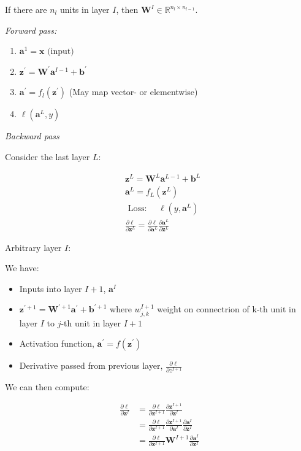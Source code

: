 \documentclass[11pt, %
	oneside, %
	english, %
	onehalfspacing, %
	parskip, %
	]{article} %
\theoremstyle{definition}
\begin{document}
If there are $n_l$ units in layer $I$, then $\mathbf{W}^{I} \in \mathbb{R}^{n_l \times n_{l-1}}$.

\noindent\emph{Forward pass:}

\begin{enumerate}
	\item $\mathbf{a}^1=\mathbf{x} \text { (input) }$
	\item $\mathbf{z}^{\prime}=\mathbf{W}^{\prime} \mathbf{a}^{I-1}+\mathbf{b}^{\prime}$
	\item $\mathbf{a}^{\prime}=f_l\left(\mathbf{z}^{\prime}\right)$  (May map vector- or elementwise)
	\item $\ell\left(\mathbf{a}^L, y\right)$
\end{enumerate}

\noindent\emph{Backward pass}

Consider the last layer $L$:

\begin{equation*}
	\begin{aligned}
		& \mathbf{z}^L=\mathbf{W}^L \mathbf{a}^{L-1}+\mathbf{b}^L \\
		& \mathbf{a}^L=f_L\left(\mathbf{z}^L\right) \\
		& \text { Loss: } \quad \ell\left(y, \mathbf{a}^L\right) \\
		& \frac{\partial \ell}{\partial \mathbf{z}^L}=\frac{\partial \ell}{\partial \mathbf{a}^L} \frac{\partial \mathbf{a}^L}{\partial \mathbf{z}^L}
		\end{aligned}
\end{equation*}

Arbitrary layer $I$:

We have:
\begin{itemize}
	\item Inputs into layer $I+1$, $\mathbf{a}^I$
	\item $\mathbf{z}^{\prime+1}=\mathbf{W}^{\prime+1} \mathbf{a}^{\prime}+\mathbf{b}^{\prime+1}$ where $w_{j,k}^{I+1}$ weight on connectrion of k-th unit in layer $I$ to $j$-th unit in layer $I+1$
	\item Activation function, $\mathbf{a}^{\prime}=f\left(\mathbf{z}^{\prime}\right)$
	\item Derivative passed from previous layer, $\frac{\partial \ell}{\partial z^{I+1}}$
\end{itemize}

We can then compute:

\begin{equation*}
	\begin{aligned}
		\frac{\partial \ell}{\partial \mathbf{z}^{I}} & =\frac{\partial \ell}{\partial \mathbf{z}^{I+1}} \frac{\partial \mathbf{z}^{I+1}}{\partial \mathbf{z}^{I}} \\
		& =\frac{\partial \ell}{\partial \mathbf{z}^{I+1}} \frac{\partial \mathbf{z}^{I+1}}{\partial \mathbf{a}^{I}} \frac{\partial \mathbf{a}^{I}}{\partial \mathbf{z}^{I}} \\
		& =\frac{\partial \ell}{\partial \mathbf{z}^{I+1}} \mathbf{W}^{I+1} \frac{\partial \mathbf{a}^{I}}{\partial \mathbf{z}^{I}}
	\end{aligned}
\end{equation*}
\end{document}

